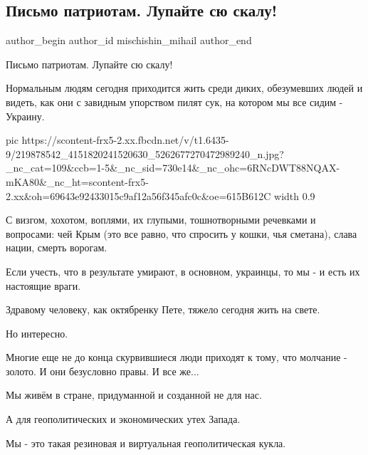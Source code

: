  
 
 
 
 
 
\subsection{Письмо патриотам. Лупайте сю скалу!}
\label{sec:21_07_2021.fb.mischishin_mihail.1.pismo_patriotam}
 
\ifcmt
 author_begin
   author_id mischishin_mihail
 author_end
\fi

Письмо патриотам.
Лупайте сю скалу!

Нормальным людям сегодня приходится жить среди диких, обезумевших людей и
видеть, как они с завидным упорством пилят сук, на котором мы все сидим -
Украину.

\ifcmt
  pic https://scontent-frx5-2.xx.fbcdn.net/v/t1.6435-9/219878542_4151820241520630_5262677270472989240_n.jpg?_nc_cat=109&ccb=1-5&_nc_sid=730e14&_nc_ohc=6RNcDWT88NQAX-mKA80&_nc_ht=scontent-frx5-2.xx&oh=69643e92433015c9af12a56f345afc0c&oe=615B612C
  width 0.9
\fi

С визгом, хохотом, воплями, их глупыми, тошнотворными речевками и вопросами:
чей Крым (это все равно, что спросить у кошки, чья сметана), слава нации,
смерть ворогам.

Если учесть, что в результате умирают, в основном, украинцы, то мы - и есть их настоящие враги.

Здравому человеку, как октябренку Пете, тяжело сегодня жить на свете.

Но интересно.

Многие еще не до конца скурвившиеся люди приходят к тому, что молчание - золото. И они безусловно правы. И все же...

Мы живём в стране, придуманной и созданной не для нас.

А для геополитических и экономических утех Запада.

Мы - это такая резиновая и виртуальная геополитическая кукла.

